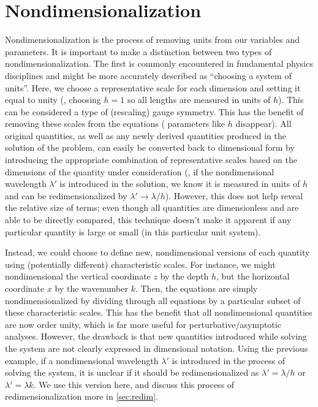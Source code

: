 \documentclass{jfm}
\let\Oldsection\section
\renewcommand{\section}{\FloatBarrier\Oldsection}
\begin{document}
\section{Nondimensionalization}
Nondimensionalization is the process of removing units from our
variables and parameters.
It is important to make a distinction between two types of
nondimensionalization.
The first is commonly encountered in fundamental physics disciplines and
might be more accurately described as ``choosing a system of units''.
Here, we choose a representative scale for each dimension and setting it
equal to unity (\eg, choosing $h = 1$ so all lengths are measured in
units of $h$).
This can be considered a type of (rescaling) gauge symmetry.
This has the benefit of removing these scales from the equations (\ie
parameters like $h$ disappear).
All original quantities, as well as any newly derived quantities
produced in the solution of the problem, can easily be converted back to
dimensional form by introducing the appropriate combination of
representative scales based on the dimensions of the quantity under
consideration (\eg, if the nondimensional wavelength $\lambda'$ is
introduced in the solution, we know it is measured in units of $h$ and
can be redimensionalized by $\lambda' \to \lambda/h$).
However, this does not help reveal the relative size of terms; even
though all quantities are dimensionless and are able to be directly
compared, this technique doesn't make it apparent if any particular
quantity is large or small (in this particular unit system).

Instead, we could choose to define new, nondimensional versions of each
quantity using (potentially different) characteristic scales.
For instance, we might nondimensional the vertical coordinate $z$ by the
depth $h$, but the horizontal coordinate $x$ by the wavenumber $k$.
Then, the equations are simply nondimensionalized by dividing
through all equations by a particular subset of these characteristic
scales.
This has the benefit that all nondimensional quantities are now order
unity, which is far more useful for perturbative/asymptotic analyses.
However, the drawback is that new quantities introduced while solving
the system are not clearly expressed in dimensional notation.
Using the previous example, if a nondimensional wavelength $\lambda'$ is
introduced in the process of solving the system, it is unclear if it
should be redimensionalized as $\lambda' = \lambda/h$ or $\lambda' =
\lambda k$.
We use this version here, and discuss this process of
redimensionalization more in \cref{sec:redim}.
\end{document}

